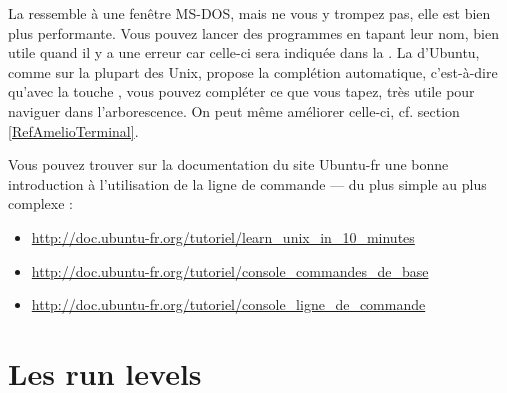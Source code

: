 La  ressemble à une fenêtre MS-DOS, mais ne vous y trompez pas, elle est bien plus performante. Vous pouvez lancer des programmes en tapant leur nom, bien utile quand il y a une erreur car celle-ci sera indiquée dans la . La  d'Ubuntu, comme sur la plupart des Unix, propose la complétion automatique, c'est-à-dire qu'avec la touche , vous pouvez compléter ce que vous tapez, très utile pour naviguer dans l'arborescence. On peut même améliorer celle-ci, cf. section \ref{RefAmelioTerminal}.\par
Vous pouvez trouver sur la documentation du site Ubuntu-fr une bonne introduction à l'utilisation de la ligne de commande --- du plus simple au plus complexe :
\begin{itemize}
\item \url{http://doc.ubuntu-fr.org/tutoriel/learn_unix_in_10_minutes}
\item \url{http://doc.ubuntu-fr.org/tutoriel/console_commandes_de_base}
\item \url{http://doc.ubuntu-fr.org/tutoriel/console_ligne_de_commande}
\end{itemize}
\section{Les run levels}
